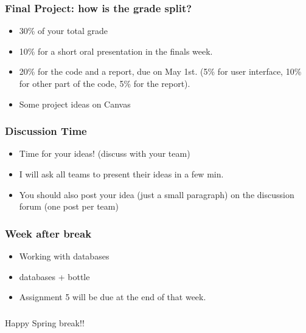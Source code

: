 \documentclass{beamer}
\begin{document}
\begin{frame}%
\frametitle{Final Project: how is the grade split?}
\begin{itemize}
\item 30\% of your total grade
\item 10\% for a short oral presentation in the finals week.
\item 20\% for the code and a report, due on May 1st. (5\% for user interface, 10\% for other part of the code, 5\% for the report). 
\item Some project ideas on Canvas
\end{itemize}
\end{frame}

\begin{frame}
\frametitle{Discussion Time}
\begin{itemize}
\item Time for your ideas! (discuss with your team)
\item I will ask all teams to present their ideas in a few min. 
\item You should also post your idea (just a small paragraph) on the discussion forum (one post per team)
\end{itemize}
\end{frame}

\begin{frame}
\frametitle{Week after break}
\begin{itemize}
\item Working with databases
\item databases + bottle
\item Assignment 5 will be due at the end of that week.
\end{itemize}
\end{frame}

\begin{frame}
\frametitle{}
\Large Happy Spring break!!
\end{frame}
\end{document}
